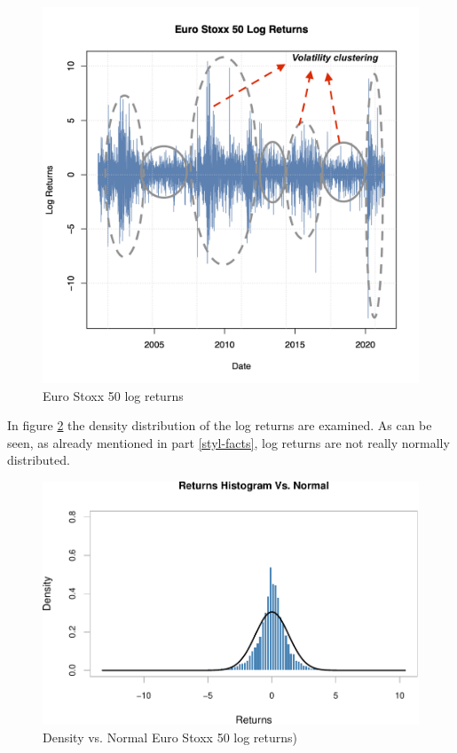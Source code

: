 \documentclass[a4paper, twoside]{templates/ociamthesis}
\begin{document}
\begin{figure}[h]

{\centering \includegraphics[width=0.7\linewidth]{figures/vol-clustering-finalized-RI} 

}

\caption{Euro Stoxx 50 log returns}\label{fig:plot2}
\end{figure}

\clearpage
\newpage

\noindent In figure \ref{fig:plot4} the density distribution of the log returns are examined. As can be seen, as already mentioned in part \ref{styl-facts}, log returns are not really normally distributed.

\begin{figure}[h]

{\centering \includegraphics[width=0.75\linewidth]{_main_files/figure-latex/plot4-1} 

}

\caption{Density vs. Normal Euro Stoxx 50 log returns)}\label{fig:plot4}
\end{figure}
\end{document}
